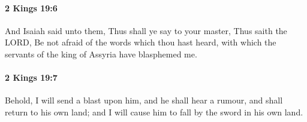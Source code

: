 		\paragraph{2 Kings 19:6} %
			\label{2KINGS-19-6}

			And Isaiah said unto them, Thus shall ye say to your master, Thus saith the LORD, Be not afraid of the words which thou hast heard, with which the servants of the king of Assyria have blasphemed me.


		\paragraph{2 Kings 19:7} %
			\label{2KINGS-19-7}

			Behold, I will send a blast upon him, and he shall hear a rumour, and shall return to his own land; and I will cause him to fall by the sword in his own land.


